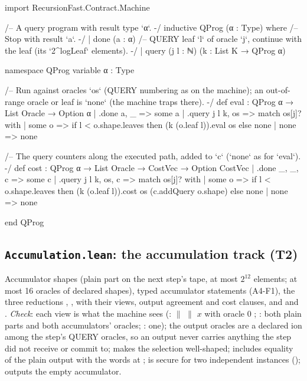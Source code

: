\begin{leancode}[fontsize=\scriptsize,label={\footnotesize Contract/QProg.lean}]
import RecursionFast.Contract.Machine

/-- A query program with result type `α`. -/
inductive QProg (α : Type) where
  /-- Stop with result `a`. -/
  | done (a : α)
  /-- QUERY leaf `l` of oracle `j`, continue with the leaf (its `2^logLeaf` elements). -/
  | query (j l : ℕ) (k : List K → QProg α)

namespace QProg
variable {α : Type}

/-- Run against oracles `os` (QUERY numbering as on the machine); an out-of-range oracle or leaf
is `none` (the machine traps there). -/
def eval : QProg α → List Oracle → Option α
  | .done a, _ => some a
  | .query j l k, os =>
    match os[j]? with
    | some o => if l < o.shape.leaves then (k (o.leaf l)).eval os else none
    | none => none

/-- The query counters along the executed path, added to `c` (`none` as for `eval`). -/
def cost : QProg α → List Oracle → CostVec → Option CostVec
  | .done _, _, c => some c
  | .query j l k, os, c =>
    match os[j]? with
    | some o => if l < o.shape.leaves then (k (o.leaf l)).cost os (c.addQuery o.shape) else none
    | none => none

end QProg
\end{leancode}

\subsection{\texttt{Accumulation.lean}: the accumulation track (T2)}

Accumulator shapes (plain part on the next step's tape, at most $2^{12}$ elements; at most 16
oracles of declared shapes), typed accumulator statements (A4-F1), the three reductions
, ,  with their views, output agreement and cost clauses, and
 and . \emph{Check}: each view is what the machine sees
(:  $\|$  $\|$ $x$ with oracle 0 ; : both
plain parts and both accumulators' oracles; : one); the output oracles are a declared
ion among the step's QUERY oracles, so an output never carries anything the step did
not receive or commit to;  makes the selection well-shaped;  includes
equality of the plain output with the words at ;  is secure for two
independent instances ();  outputs the empty accumulator.


